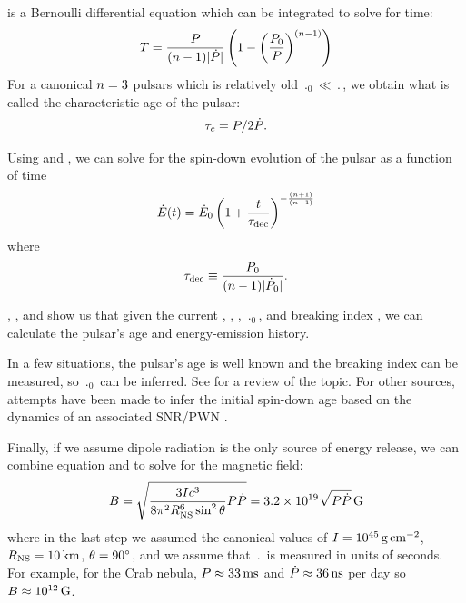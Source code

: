  is a Bernoulli differential
equation which can be integrated to solve for time:
\begin{equation}\eqnlabel{pulsar_age}
  T = \frac{\period}{(\breakingindex-1) \absval{\perioddot}}
  \left(
  1-\left(\frac{\period_0}{\period}\right)^{(\breakingindex-1)}
  \right)
\end{equation}
For a canonical $n=3$ pulsars which is relatively old
$\period_0 \ll \period$, we obtain what is called the characteristic
age of the pulsar:
\begin{equation}
  \tau_c = P/2\dot{P}.
\end{equation}

Using  and ,
we can solve for the spin-down evolution of the pulsar as a function of
time \citep{pacini_1973_evolution-supernova}
\begin{equation}\eqnlabel{energy_dot_vs_time}
    \energydot(t) = \energydot_0
    \left(
    1 + \frac{\time}{\SpinDownTimescale}
    \right)^{-\frac{(\breakingindex+1)}{(\breakingindex-1)}}
\end{equation}
where
\begin{equation}
  \tau_\text{dec} \equiv \frac{P_0}{(n-1)|\dot{P}_0|}.
\end{equation}


, ,
and  show us that given the current \period,
\perioddot, \energydot, $\period_0$, and breaking index \breakingindex,
we can calculate the pulsar's age and energy-emission history.

In a few situations, the pulsar's age is well known and the
breaking index can be measured, so $\period_0$ can be inferred. See
\cite{kaspi_2002_constraining-birth} for a review of the topic. For
other sources, attempts have been made to infer the initial spin-down
age based on the dynamics of an associated \ac{SNR}/\ac{PWN}
\citep{van-der-swaluw_2001_inferring-initial}.

Finally, if we assume dipole radiation is the only source of energy
release, we can combine equation  and
 to solve for the magnetic field:
\begin{equation}
  B = \sqrt{\frac{3Ic^3}{
  8\pi^2R_\text{NS}^6\sin^2\theta}P\dot{P}}
  = 3.2\times 10^{19} \sqrt{P\dot{P}} \,\text{G}
\end{equation}
where in the last step we assumed the canonical values of
$I=10^{45}\,\text{g}\,\text{cm}^{-2}$,
$R_\text{NS}=10\,\text{km}$, $\theta=90^\circ$, and we
assume that $\period$ is measured in units of seconds.  For example,
for the Crab nebula, $P\approx33\,\text{ms}$
\citep{staelin_1968_pulsating-radio} and
$\dot{P}\approx36\,\text{ns}$
per day \citep{richards_1969a_period-pulsar} so
$B\approx10^{12}\,\text{G}$.
